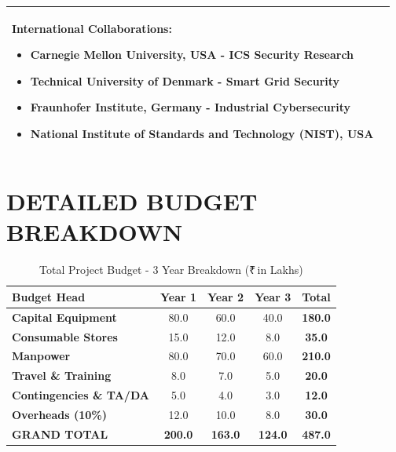 \documentclass[12pt,a4paper]{article}
\newcommand{\rupees}{₹\,}
\renewcommand{\arraystretch}{1.3}
\begin{document}
\begin{longtable}{|p{3cm}|p{12cm}|}
\textbf{International Collaborations:}
\begin{itemize}[leftmargin=1em]
    \item Carnegie Mellon University, USA - ICS Security Research
    \item Technical University of Denmark - Smart Grid Security
    \item Fraunhofer Institute, Germany - Industrial Cybersecurity
    \item National Institute of Standards and Technology (NIST), USA
\end{itemize} \\
\hline

\end{longtable}

\newpage

\section{DETAILED BUDGET BREAKDOWN}

\begin{table}[H]
\centering
\caption{Total Project Budget - 3 Year Breakdown (\rupees in Lakhs)}
\renewcommand{\arraystretch}{1.5}
\begin{tabular}{|p{3.5cm}|c|c|c|c|}
\hline
\rowcolor{lightblue}
\textbf{Budget Head} & \textbf{Year 1} & \textbf{Year 2} & \textbf{Year 3} & \textbf{Total} \\
\hline

\textbf{Capital Equipment} & 80.0 & 60.0 & 40.0 & \textbf{180.0} \\
\hline

\textbf{Consumable Stores} & 15.0 & 12.0 & 8.0 & \textbf{35.0} \\
\hline

\textbf{Manpower} & 80.0 & 70.0 & 60.0 & \textbf{210.0} \\
\hline

\textbf{Travel \& Training} & 8.0 & 7.0 & 5.0 & \textbf{20.0} \\
\hline

\textbf{Contingencies \& TA/DA} & 5.0 & 4.0 & 3.0 & \textbf{12.0} \\
\hline

\textbf{Overheads (10\%)} & 12.0 & 10.0 & 8.0 & \textbf{30.0} \\
\hline

\rowcolor{yellow}
\textbf{GRAND TOTAL} & \textbf{200.0} & \textbf{163.0} & \textbf{124.0} & \textbf{487.0} \\
\hline

\end{tabular}
\end{table}
\end{document}
